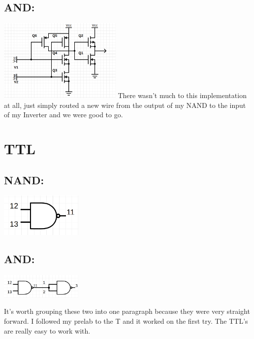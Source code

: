 \documentclass[11pt]{article}
\begin{document}
\subsection[]{AND:}
\includegraphics[width=6cm, keepaspectratio]{AND}\newline
There wasn't much to this implementation at all, just simply routed a new wire
from the output of my NAND to the input of my Inverter and we were good to go.
\newpage

\section{TTL}
\subsection[]{NAND:}
\includegraphics[width=4cm, keepaspectratio]{NAND-C}\newline
\subsection[]{AND:}
\includegraphics[width=4cm, keepaspectratio]{AND-C}\newline

It's worth grouping these two into one paragraph because they were very straight forward.
I followed my prelab to the T and it worked on the first try. The TTL's are really easy to 
work with.
\end{document}
